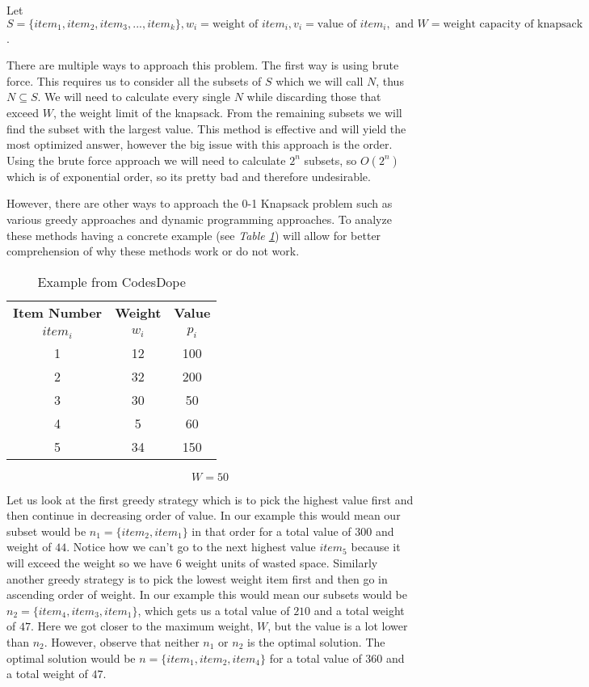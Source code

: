 Let $S = \{item_1, item_2, item_3, ..., item_k\}, w_i = \mbox{weight of } item_i, v_i = \mbox{value of } item_i, \mbox{ and } W = \mbox{weight capacity of knapsack}$. 

\forceindent There are multiple ways to approach this problem. The first way is using brute force. This requires us to consider all the subsets of $S$ which we will call $N$, thus $N \subseteq S$. We will need to calculate every single $N$ while discarding those that exceed $W$, the weight limit of the knapsack. From the remaining subsets we will find the subset with the largest value. This method is effective and will yield the most optimized answer, however the big issue with this approach is the order. Using the brute force approach we will need to calculate $2^n$ subsets, so $O(2^n)$ which is of exponential order, so its pretty bad and therefore undesirable.

\forceindent However, there are other ways to approach the 0-1 Knapsack problem such as various greedy approaches and dynamic programming approaches. To analyze these methods having a concrete example (see \textit{Table \ref{tab:example1}}) will allow for better comprehension of why these methods work or do not work. 
\newpage
\begin{table}[h!]
	\begin{center}
		\caption{Example from CodesDope \cite{noauthor_knapsack_nodate-2}}
		\label{tab:example1}
		\begin{tabular}{c|c|c}
			\toprule %
			\textbf{Item Number} & \textbf{Weight} & \textbf{Value}\\
			$item_i$ & $w_i$ & $p_i$ \\
			\midrule %
			1 & 12 & 100 \\
			2 & 32 & 200 \\
			3 & 30 & 50 \\
			4 & 5 & 60 \\
			5 & 34 & 150
		\end{tabular}
	\end{center} \vspace{12pt}
	$$
	W = 50
	$$
\end{table}

\forceindent Let us look at the first greedy strategy which is to pick the highest value first and then continue in decreasing order of value. In our example this would mean our subset would be $n_1 = \{item_2, item_1\}$ in that order for a total value of $300$ and weight of $44$. Notice how we can't go to the next highest value $item_5$ because it will exceed the weight so we have $6$ weight units of wasted space. Similarly another greedy strategy is to pick the lowest weight item first and then go in ascending order of weight. In our example this would mean our subsets would be $n_2 = \{item_4, item_3, item_1\}$, which gets us a total value of $210$ and a total weight of $47$. Here we got closer to the maximum weight, $W$, but the value is a lot lower than $n_2$. However, observe that neither $n_1$ or $n_2$ is the optimal solution. The optimal solution would be $n = \{item_1, item_2, item_4\}$ for a total value of $360$ and a total weight of $47$.

